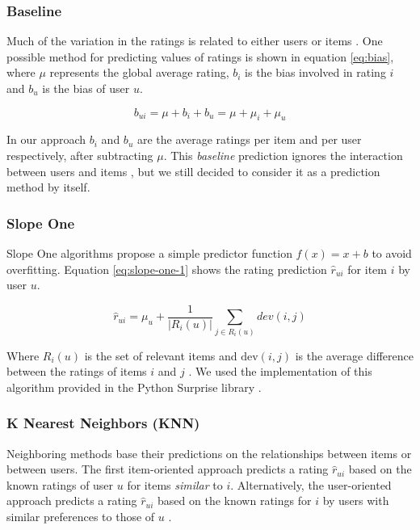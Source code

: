 \documentclass[10pt,conference,compsocconf]{IEEEtran}
\begin{document}
    \subsubsection{Baseline} %
    \label{ssub:baseline}
      Much of the variation in the ratings is related to either users or items \cite{koren2009matrix}. One possible method for predicting values of ratings is shown in equation \ref{eq:bias}, where $\mu$ represents the global average rating, $b_i$ is the bias involved in rating $i$ and $b_u$ is the bias of user $u$.

      \begin{equation}
        \label{eq:bias}
        b_{ui} = \mu + b_i + b_u = \mu + \mu_i + \mu_u
      \end{equation}

      In our approach $b_i$ and $b_u$ are the average ratings per item and per user respectively, after subtracting $\mu$. This \emph{baseline} prediction ignores the interaction between users and items \cite{koren2009matrix}, but we still decided to consider it as a prediction method by itself.

    \subsubsection{Slope One} %
    \label{ssub:slope_one}
      Slope One algorithms propose a simple predictor function $f(x) = x + b$ to avoid overfitting. Equation \ref{eq:slope-one-1} shows the rating prediction $\hat{r}_{ui}$ for item $i$ by user $u$.

      \begin{equation}
          \label{eq:slope-one-1}
          \hat{r}_{ui} = \mu_u + \frac{1}{|R_i(u)|} \sum_{j \in R_i(u)} dev(i,j)
      \end{equation}

      Where $R_i(u)$ is the set of relevant items and $\text{dev}(i,j)$ is the average difference between the ratings of items $i$ and $j$ \cite{lemire2005slope}. We used the implementation of this algorithm provided in the Python Surprise library \cite{surprise}.

    \subsubsection{K Nearest Neighbors (KNN)} %
    \label{ssub:k_nearest_neighbors}
      Neighboring methods base their predictions on the relationships between items or between users. The first item-oriented approach predicts a rating $\hat{r}_{ui}$ based on the known ratings of user $u$ for items \emph{similar} to $i$. Alternatively, the user-oriented approach predicts a rating $\hat{r}_{ui}$ based on the known ratings for $i$ by users with similar preferences to those of $u$ \cite{koren2009matrix, koren2010factor}.
\end{document}
